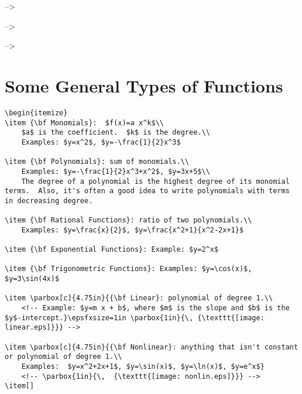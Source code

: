 \documentclass[]{book}
\theoremstyle{definition}
\theoremstyle{definition}
\theoremstyle{definition}
\theoremstyle{remark}
\begin{document}
--\textgreater{}

--\textgreater{}

--\textgreater{}

\section{Some General Types of
Functions}\label{some-general-types-of-functions}

\begin{verbatim}
\begin{itemize}
\item {\bf Monomials}:  $f(x)=a x^k$\\
    $a$ is the coefficient.  $k$ is the degree.\\
    Examples: $y=x^2$, $y=-\frac{1}{2}x^3$

\item {\bf Polynomials}: sum of monomials.\\
    Examples: $y=-\frac{1}{2}x^3+x^2$, $y=3x+5$\\
    The degree of a polynomial is the highest degree of its monomial terms.  Also, it's often a good idea to write polynomials with terms in decreasing degree.

\item {\bf Rational Functions}: ratio of two polynomials.\\
    Examples: $y=\frac{x}{2}$, $y=\frac{x^2+1}{x^2-2x+1}$

\item {\bf Exponential Functions}: Example: $y=2^x$

\item {\bf Trigonometric Functions}: Examples: $y=\cos(x)$, $y=3\sin(4x)$

\item \parbox[c]{4.75in}{{\bf Linear}: polynomial of degree 1.\\
    <!-- Example: $y=m x + b$, where $m$ is the slope and $b$ is the $y$-intercept.}\epsfxsize=1in \parbox{1in}{\, {\texttt{[image: linear.eps]}}} -->

\item \parbox[c]{4.75in}{{\bf Nonlinear}: anything that isn't constant or polynomial of degree 1.\\
    Examples:  $y=x^2+2x+1$, $y=\sin(x)$, $y=\ln(x)$, $y=e^x$}
    <!-- \parbox{1in}{\,  {\texttt{[image: nonlin.eps]}}} -->
\item[]
\end{verbatim}
\end{document}
